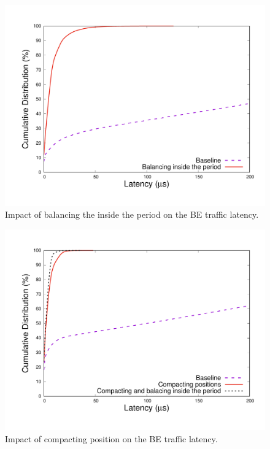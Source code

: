 \documentclass[10pt, conference, letterpaper]{IEEEtran}
\begin{document}
\begin{figure}[h!]
\begin{center}   

      \includegraphics[scale=0.25]{periodonly}
     \caption{Impact of balancing the inside the period on the BE traffic latency.}\label{fig:periodonly}
     
\end{center}
  \end{figure}
  
\begin{figure}[h!]
\begin{center}   

      \includegraphics[scale=0.25]{repart1res}
     \caption{Impact of compacting position on the BE traffic latency.}   \label{fig:algocmp}
\end{center}
  \end{figure}
  
\end{document}
